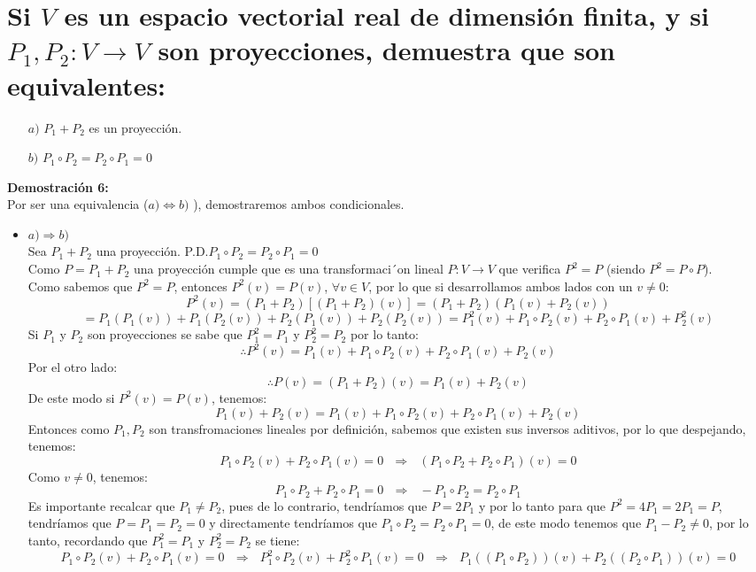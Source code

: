 
\section{ Si $V$ es un espacio vectorial real de dimensión finita, y si $P_1,P_2:V \rightarrow V $ son proyecciones,
demuestra que son equivalentes:}
\begin{itemize}
    \item [$a)$] $P_1+P_2$ es un proyección.
    \item [$b)$] $P_1 \circ P_2=P_2 \circ P_1=0$
\end{itemize}
\textbf{Demostraci\'on 6:}\\
Por ser una equivalencia (\ie $a)\Longleftrightarrow b)$ ), demostraremos ambos condicionales.
\begin{itemize}
\item $a)\Longrightarrow b)$\\
    Sea $P_1+P_2$ una proyección. P.D.$P_1 \circ P_2=P_2 \circ P_1=0$ \\
   Como $P=P_1+P_2$ una proyección cumple que es una transformaci´on lineal $P : V \rightarrow V$ que verifica $P^2=P$ (siendo $P^2 = P\circ P$).\\
   Como sabemos que $P^2=P$, entonces $P^2(v)=P(v)$, $\forall v\in V$, por lo que si desarrollamos ambos lados con un $v\neq0$:
   \[P^2(v)=(P_1+P_2)[(P_1+P_2)(v)]=(P_1+P_2)(P_1(v)+P_2(v))\]\[=P_1(P_1(v))+P_1(P_2(v))+P_2(P_1(v))+P_2(P_2(v))=P_1^2(v)+P_1\circ P_2(v)+P_2\circ P_1(v)+P_2^2(v)\]
   Si $P_1$ y $P_2$ son proyecciones se sabe que $P_1^2=P_1$ y $P_2^2=P_2$ por lo tanto:
   \[\therefore P^2(v)=P_1(v)+P_1\circ P_2(v)+P_2\circ P_1(v)+P_2(v)\]
   Por el otro lado:
   \[\therefore P(v)=(P_1+P_2)(v)=P_1(v)+P_2(v)\]
   De este modo si $P^2(v)=P(v)$, tenemos:
   \[P_1(v)+P_2(v)=P_1(v)+P_1\circ P_2(v)+P_2\circ P_1(v)+P_2(v)\]
   Entonces como $P_1,P_2$ son transfromaciones lineales por definici\'on, sabemos que existen sus inversos aditivos, por lo que despejando, tenemos:
   \[P_1\circ P_2(v)+P_2\circ P_1(v)=0~~~\Longrightarrow~~~(P_1\circ P_2+P_2\circ P_1)(v)=0\]Como $v\neq 0$, tenemos:
   \[P_1\circ P_2+P_2\circ P_1=0~~~\Longrightarrow~~~-P_1\circ P_2=P_2\circ P_1\]
   Es importante recalcar que $P_1\neq P_2$, pues de lo contrario, tendr\'iamos que $P=2P_1$ y por lo tanto para que $P^2=4P_1=2P_1=P$, tendr\'iamos que $P=P_1=P_2=0$  y directamente tendr\'iamos que $P_1 \circ P_2=P_2 \circ P_1=0$, de este modo tenemos que $P_1-P_2\neq 0$, por lo tanto, recordando que $P_1^2=P_1$ y $P_2^2=P_2$ se tiene:
   \[P_1\circ P_2(v)+P_2\circ P_1(v)=0~~~\Longrightarrow~~~P_1^2\circ P_2(v)+P_2^2\circ P_1(v)=0~~~\Longrightarrow~~~P_1((P_1\circ P_2))(v)+P_2((P_2\circ P_1))(v)=0\]

\end{itemize}
